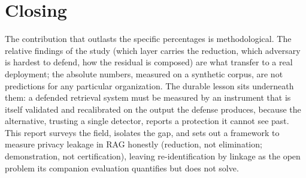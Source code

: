 \documentclass[12pt,a4paper]{report}
\begin{document}
\section{Closing}
\label{sec:concl-closing}

The contribution that outlasts the specific percentages is methodological. The relative findings
of the study (which layer carries the reduction, which adversary is hardest to defend, how the
residual is composed) are what transfer to a real deployment; the absolute numbers, measured on
a synthetic corpus, are not predictions for any particular organization. The durable lesson sits
underneath them: a defended retrieval system must be measured by an instrument that is itself
validated and recalibrated on the output the defense produces, because the alternative, trusting
a single detector, reports a protection it cannot see past. This report surveys the field,
isolates the gap, and sets out a framework to measure privacy leakage in RAG honestly (reduction,
not elimination; demonstration, not certification), leaving re-identification by linkage as the
open problem its companion evaluation quantifies but does not solve.



\nocite{*}


\end{document}
